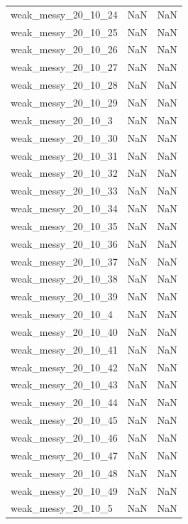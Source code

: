 \begin{longtable}{lcc}
weak\_messy\_20\_10\_24    &      NaN &     NaN \\
weak\_messy\_20\_10\_25    &      NaN &     NaN \\
weak\_messy\_20\_10\_26    &      NaN &     NaN \\
weak\_messy\_20\_10\_27    &      NaN &     NaN \\
weak\_messy\_20\_10\_28    &      NaN &     NaN \\
weak\_messy\_20\_10\_29    &      NaN &     NaN \\
weak\_messy\_20\_10\_3     &      NaN &     NaN \\
weak\_messy\_20\_10\_30    &      NaN &     NaN \\
weak\_messy\_20\_10\_31    &      NaN &     NaN \\
weak\_messy\_20\_10\_32    &      NaN &     NaN \\
weak\_messy\_20\_10\_33    &      NaN &     NaN \\
weak\_messy\_20\_10\_34    &      NaN &     NaN \\
weak\_messy\_20\_10\_35    &      NaN &     NaN \\
weak\_messy\_20\_10\_36    &      NaN &     NaN \\
weak\_messy\_20\_10\_37    &      NaN &     NaN \\
weak\_messy\_20\_10\_38    &      NaN &     NaN \\
weak\_messy\_20\_10\_39    &      NaN &     NaN \\
weak\_messy\_20\_10\_4     &      NaN &     NaN \\
weak\_messy\_20\_10\_40    &      NaN &     NaN \\
weak\_messy\_20\_10\_41    &      NaN &     NaN \\
weak\_messy\_20\_10\_42    &      NaN &     NaN \\
weak\_messy\_20\_10\_43    &      NaN &     NaN \\
weak\_messy\_20\_10\_44    &      NaN &     NaN \\
weak\_messy\_20\_10\_45    &      NaN &     NaN \\
weak\_messy\_20\_10\_46    &      NaN &     NaN \\
weak\_messy\_20\_10\_47    &      NaN &     NaN \\
weak\_messy\_20\_10\_48    &      NaN &     NaN \\
weak\_messy\_20\_10\_49    &      NaN &     NaN \\
weak\_messy\_20\_10\_5     &      NaN &     NaN \\

\end{longtable}
